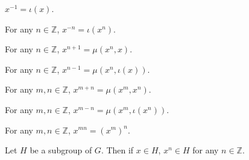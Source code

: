 \begin{theorem}
    \label{theorem : gpow_neg_one}
    \leanok
    $x^{-1} = \iota(x)$.
\end{theorem}

\begin{theorem}
    \label{theorem : gpow_neg}
    For any $n \in \mathbb{Z}$, $x^{-n} = \iota(x^n)$.
\end{theorem}

\begin{theorem}
    \label{theorem : gpow_succ}
    For any $n \in \mathbb{Z}$, $x^{n+1} = \mu(x^n, x)$.
\end{theorem}

\begin{theorem}
    \label{theorem : gpow_pred}
    For any $n \in \mathbb{Z}$, $x^{n-1} = \mu(x^n, \iota(x))$.
\end{theorem}

\begin{theorem}
    \label{theorem : gpow_add}
    For any $m,n \in \mathbb{Z}$, $x^{m+n} = \mu(x^m, x^n)$.
\end{theorem}

\begin{theorem}
    \label{theorem : gpow_sub}
    \leanok
    For any $m,n \in \mathbb{Z}$, $x^{m-n} = \mu(x^m, \iota(x^n))$.
\end{theorem}

\begin{theorem}
    \label{theorem : gpow_mul}
    For any $m,n \in \mathbb{Z}$, $x^{mn} = (x^m)^n$.
\end{theorem}

\begin{theorem}
    \label{theorem : gpow_closure}
    \leanok
    Let $H$ be a subgroup of $G$. Then if $x \in H$, $x^n \in H$ for any $n \in \mathbb{Z}$.
\end{theorem}
